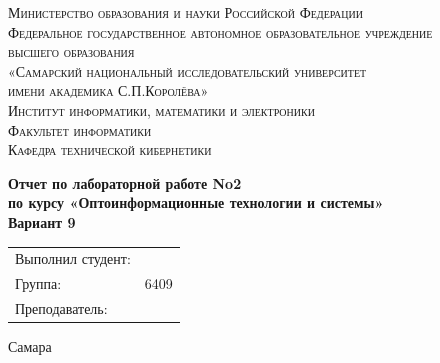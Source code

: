 \begin{titlepage}
							
	\center
							
							
	\textsc{Министерство образования и науки Российской Федерации}\\[-0.15cm]
	\textsc{Федеральное государственное автономное образовательное учреждение \\[-0.15cm] высшего образования}\\[-0.15cm] 
	\textsc{«Самарский национальный исследовательский университет \\[-0.15cm] имени академика С.П.Королёва»}\\[0.5cm]
	\textsc{Институт информатики, математики и электроники}\\[-0.7em]
	\textsc{Факультет информатики}\\[-0.7em]
	\textsc{Кафедра технической кибернетики}\\[-1em]
						
							
	\vfill\vfill
						    
							
	{\textbf{Отчет по лабораторной работе No2}}\\[-0.7em]
	{\textbf{по курсу «Оптоинформационные технологии и системы»}}\\
	{\textbf{Вариант 9}}\\
	
    \vfill\vfill\vfill\vfill\vfill\vfill\vfill\vfill\vfill
							
	\begin{minipage}{1\textwidth}
		\begin{center}
			\begin{tabularx}{\textwidth}{X l}
				Выполнил студент:        & \firstAuthorSurName \firstAuthorInitials \\
				Группа:                    & 6409                     		           \\
				Преподаватель:                  & \teacherName         		                \\
			\end{tabularx}
		\end{center}
	\end{minipage}
							
						
							
	\vfill\vfill\vfill
					
	{\centering Самара \the\year}
							
							
\end{titlepage}

